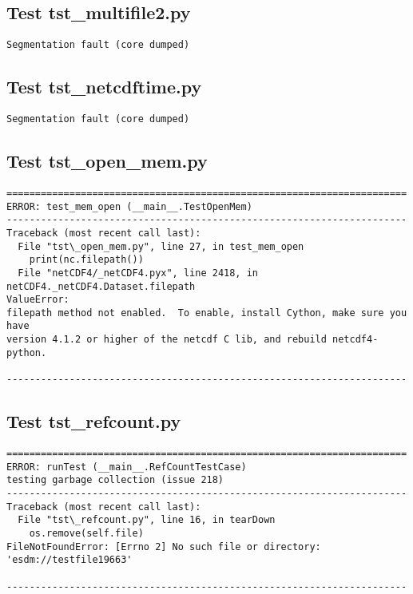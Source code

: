 \subsection{Test tst\_multifile2.py}

\begin{verbatim}
Segmentation fault (core dumped)
\end{verbatim}

\subsection{Test tst\_netcdftime.py}

\begin{verbatim}
Segmentation fault (core dumped)
\end{verbatim}

\subsection{Test tst\_open\_mem.py}

\begin{verbatim}
======================================================================
ERROR: test_mem_open (__main__.TestOpenMem)
----------------------------------------------------------------------
Traceback (most recent call last):
  File "tst\_open_mem.py", line 27, in test_mem_open
    print(nc.filepath())
  File "netCDF4/_netCDF4.pyx", line 2418, in netCDF4._netCDF4.Dataset.filepath
ValueError:
filepath method not enabled.  To enable, install Cython, make sure you have
version 4.1.2 or higher of the netcdf C lib, and rebuild netcdf4-python.

----------------------------------------------------------------------
\end{verbatim}

\subsection{Test tst\_refcount.py}

\begin{verbatim}
======================================================================
ERROR: runTest (__main__.RefCountTestCase)
testing garbage collection (issue 218)
----------------------------------------------------------------------
Traceback (most recent call last):
  File "tst\_refcount.py", line 16, in tearDown
    os.remove(self.file)
FileNotFoundError: [Errno 2] No such file or directory: 'esdm://testfile19663'

----------------------------------------------------------------------
\end{verbatim}

